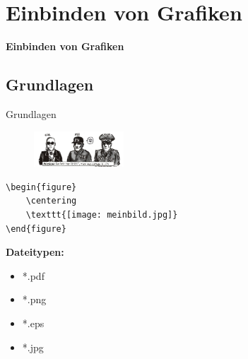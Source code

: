 \documentclass["WS\space 16-17\space -\space LaTeX-Kurs\space -\space Praesentation\space -\space 2.tex"]{subfiles}
\begin{document}
\section{Einbinden von Grafiken}
\begin{frame}[c]
	\begin{center}
		\LARGE \textbf{Einbinden von Grafiken}
	\end{center}
\end{frame}
\subsection{Grundlagen}
\begin{frame}[c]
	\begin{center}
		\large Grundlagen
	\end{center}
\end{frame}
\begin{frame}[fragile]
	\Ausgabe
	\begin{outputbox}
		\begin{figure}
			\centering
			\includegraphics[width=0.3\textwidth]{img/loewenjagd}
		\end{figure}
	\end{outputbox}

	\pause\Code
	\begin{lstlisting}
\begin{figure}
	\centering
	\texttt{[image: meinbild.jpg]}
\end{figure}
	\end{lstlisting}

	\pause\textbf{Dateitypen:}\vspace{-0.2cm}
	\begin{itemize}
		\item *.pdf
		\item *.png
		\item *.eps
		\item *.jpg
	\end{itemize}
\end{frame}
\end{document}
